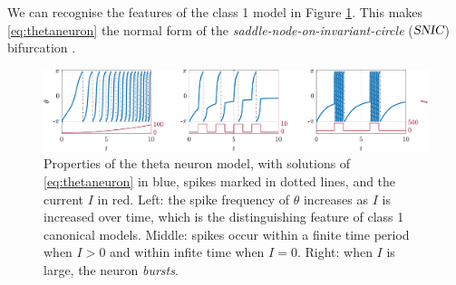 We can recognise the features of the class 1 model in Figure \ref{fig:ThetaNeuronResponseToCurrent}. This makes \eqref{eq:thetaneuron} the normal form of the \textit{saddle-node-on-invariant-circle} (${\textsl{SNIC}}$) bifurcation \cite{Luke2013}.

\begin{figure}[H]
\centering
\includegraphics[width = \textwidth]{../Figures/ThetaNeuronResponseToCurrent.pdf}
\caption{Properties of the theta neuron model, with solutions of \eqref{eq:thetaneuron} in blue, spikes marked in dotted lines, and the current $I$ in red. Left: the spike frequency of $\theta$ increases as $I$ is increased over time, which is the distinguishing feature of class 1 canonical models. Middle: spikes occur within a finite time period when $I > 0$ and within infite time when $I = 0$. Right: when $I$ is large, the neuron \textsl{bursts}.}
\label{fig:ThetaNeuronResponseToCurrent}
\end{figure}

